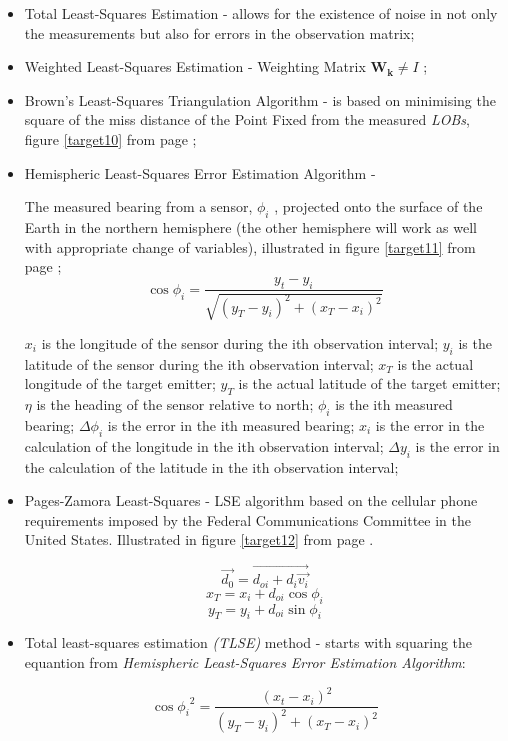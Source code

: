 \documentclass[english,purist]{ist-report}
\begin{document}
\begin{itemize}
    \item Total Least-Squares Estimation - allows for the existence of noise in not only the measurements but also for errors in the observation matrix;
    \item Weighted Least-Squares Estimation - Weighting Matrix  $\mathbf{W_k}\neq I $ ;
    \item Brown’s Least-Squares Triangulation Algorithm - is based on minimising the square of the miss distance of the Point Fixed from the measured \textit{LOBs}, figure \ref{target10} from page \pageref{target10};
    \item Hemispheric Least-Squares Error Estimation Algorithm -
    
The measured bearing from a sensor, $\phi_i$ , projected onto
the surface of the Earth in the northern hemisphere (the other hemisphere will work as well with appropriate change of variables), illustrated in figure \ref{target11} from page \pageref{target11};
\begin{equation*}
    \cos{\phi_i}= \frac{y_t - y_i}{\sqrt{(y_T - y_i)^2+(x_T - x_i)^2}}
\end{equation*}

$x_i$ is the longitude of the sensor during the ith observation interval;
$y_i$ is the latitude of the sensor during the ith observation interval;
$x_T$ is the actual longitude of the target emitter;
$y_T$ is the actual latitude of the target emitter;
$\eta$ is the heading of the sensor relative to north;
$\phi_i$ is the ith measured bearing;
$\Delta \phi_i$ is the error in the ith measured bearing;
$x_i$ is the error in the calculation of the longitude in the ith observation interval;
$\Delta y_i$ is the error in the calculation of the latitude in the ith observation interval; 

\item Pages-Zamora Least-Squares - LSE algorithm based on the
cellular phone requirements imposed by the Federal Communications Committee in the United States. Illustrated in figure \ref{target12} from page \pageref{target12}.  

\begin{equation*}
    \Vec{d_0}= \Vec{d_{oi}+ d_i\Vec{v_i}} 
\end{equation*}
\begin{equation*}
    x_T = x_i + d_{oi}\cos{\phi_i}
\end{equation*}
\begin{equation*}
    y_T = y_i + d_{oi}\sin{\phi_i}
\end{equation*}


\item Total least-squares estimation \textit{(TLSE)} method - starts with squaring the equantion from \textit{Hemispheric Least-Squares Error Estimation Algorithm}:

\begin{equation*}
    \cos{\phi_i}^2= \frac{(x_t - x_i)^2}{(y_T - y_i)^2+(x_T - x_i)^2}
\end{equation*}


\end{itemize}
\end{document}
